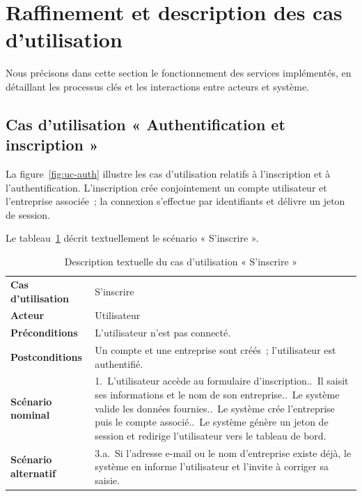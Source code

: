 \section{Raffinement et description des cas d'utilisation}
Nous précisons dans cette section le fonctionnement des services
implémentés, en détaillant les processus clés et les interactions entre
acteurs et système.

\subsection{Cas d'utilisation « Authentification et inscription »}
La figure~\ref{fig:uc-auth} illustre les cas d'utilisation relatifs à
l'inscription et à l'authentification. L'inscription crée conjointement un
compte utilisateur et l'entreprise associée~; la connexion s'effectue par
identifiants et délivre un jeton de session.


Le tableau~\ref{tab:uc-inscription} décrit textuellement le scénario
« S'inscrire ».

\begin{table}[H]
\centering
\caption{Description textuelle du cas d'utilisation « S'inscrire »}
\label{tab:uc-inscription}
\small
\begin{tabularx}{\linewidth}{lX}
\toprule
\textbf{Cas d'utilisation} & S'inscrire \\
\textbf{Acteur} & Utilisateur \\
\textbf{Préconditions} & L'utilisateur n'est pas connecté. \\
\textbf{Postconditions} & Un compte et une entreprise sont créés~; l'utilisateur est authentifié. \\
\midrule
\textbf{Scénario nominal} &
1.~L'utilisateur accède au formulaire d'inscription.\newline
2.~Il saisit ses informations et le nom de son entreprise.\newline
3.~Le système valide les données fournies.\newline
4.~Le système crée l'entreprise puis le compte associé.\newline
5.~Le système génère un jeton de session et redirige l'utilisateur vers le tableau de bord. \\
\midrule
\textbf{Scénario alternatif} &
3.a.~Si l'adresse e-mail ou le nom d'entreprise existe déjà, le système en informe l'utilisateur et l'invite à corriger sa saisie. \\
\bottomrule
\end{tabularx}
\end{table}


